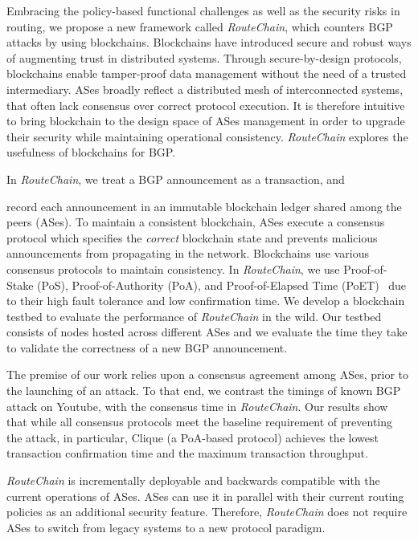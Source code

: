\documentclass[5p]{elsarticle}
\newcommand{\rc}{{{\em RouteChain}}\xspace}
\begin{document}

Embracing the policy-based functional challenges as well as the security risks in routing, we propose a new framework called \rc, which counters BGP attacks by using blockchains. Blockchains have introduced secure and robust ways of augmenting trust in distributed systems. Through secure-by-design protocols, blockchains enable tamper-proof data management without the need of a trusted intermediary. ASes broadly reflect a distributed mesh of interconnected systems, that often lack consensus over correct protocol execution. It is therefore intuitive to bring blockchain to the design space of ASes management in order to upgrade their security while maintaining operational consistency. \rc explores the usefulness of blockchains for BGP. 

In \rc, we treat a BGP announcement as a transaction, and {\color{blue} record each announcement in an immutable blockchain ledger shared among the peers (ASes). To maintain a consistent blockchain, ASes execute a consensus protocol which specifies the {\em correct} blockchain state and prevents malicious announcements from propagating in the network. Blockchains use various consensus protocols to maintain consistency. In \rc, we use Proof-of-Stake (PoS), Proof-of-Authority (PoA), and Proof-of-Elapsed Time (PoET)~\cite{BanoSAAMMD17,Angelis18,SaadSNKSNM20} due to their high fault tolerance and low confirmation time. We develop a blockchain testbed to evaluate the performance of \rc in the wild. Our testbed consists of nodes hosted across different ASes and we evaluate the time they take to validate the correctness of a new BGP announcement. 





The premise of our work relies upon a consensus agreement among ASes, prior to the launching of an attack. To that end, we contrast the timings of known BGP attack on Youtube, with the consensus time in \rc. Our results show that while all consensus protocols meet the baseline requirement of preventing the attack, in particular, Clique (a PoA-based protocol) achieves the lowest transaction confirmation time and the maximum transaction throughput.} \rc is incrementally deployable and backwards compatible with the current operations of ASes. ASes can use it in parallel with their current routing policies as an additional security feature. Therefore, \rc does not require ASes to switch from legacy systems to a new protocol paradigm. 
\end{document}
